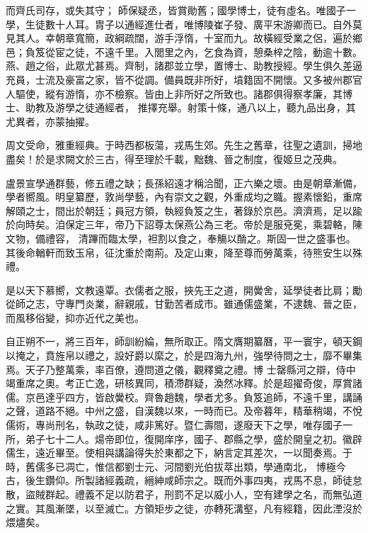 \begin{pinyinscope}
 而齊氏司存，或失其守；
 師保疑丞，皆賞勛舊；國學博士，徒有虛名。唯國子一學，生徒數十人耳。胄子以通經進仕者，唯博陵崔子發、廣平宋游卿而已。自外莫見其人。幸朝章寬簡，政綱疏闊，游手浮惰，十室而九。故橫經受業之侶，遍於鄉邑；負笈從宦之徒，不遠千里。入閭里之內，乞食為資，憩桑梓之陰，動逾十數。燕、趙之俗，此眾尤甚焉。齊制，諸郡並立學，置博士、助教授經。學生俱久差逼充員，士流及豪富之家，皆不從調。備員既非所好，墳籍固不開懷。又多被州郡官人驅使，縱有游惰，亦不檢察。皆由上非所好之所致也。諸郡俱得察孝廉，其博士、助教及游學之徒通經者，
 推擇充舉。射策十條，通八以上，聽九品出身，其尤異者，亦蒙抽擢。



 周文受命，雅重經典。于時西都板蕩，戎馬生郊。先生之舊章，往聖之遺訓，掃地盡矣！於是求闕文於三古，得至理於千載，黜魏、晉之制度，復姬旦之茂典。



 盧景宣學通群藝，修五禮之缺；長孫紹遠才稱洽聞，正六樂之壞。由是朝章漸備，學者嚮風。明皇纂歷，敦尚學藝，內有崇文之觀，外重成均之職。握素懷鉛，重席解頤之士，間出於朝廷；員冠方領，執經負笈之生，著錄於京邑。濟濟焉，足以踰於向時矣。洎保定三年，帝乃下詔尊太保燕公為三老。帝於是服兗冕，乘碧輅，陳文物，備禮容，
 清蹕而臨太學，袒割以食之，奉觴以酳之。斯固一世之盛事也。其後命輶軒而致玉帛，征沈重於南荊。及定山東，降至尊而勞萬乘，待熊安生以殊禮。



 是以天下慕嚮，文教遠覃。衣儒者之服，挾先王之道，開黌舍，延學徒者比肩；勵從師之志，守專門炎業，辭親戚，甘勤苦者成市。雖通儒盛業，不逮魏、晉之臣，而風移俗變，抑亦近代之美也。



 自正朔不一，將三百年，師訓紛綸，無所取正。隋文膺期纂曆，平一寰宇，頓天鋼以掩之，賁旌帛以禮之，設好爵以縻之，於是四海九州，強學待問之士，靡不畢集焉。天子乃整萬乘，率百僚，遵問道之儀，觀釋奠之禮。博
 士罄縣河之辯，侍中竭重席之奧。考正亡逸，研核異同，積滯群疑，渙然冰釋。於是超擢奇俊，厚賞諸儒。京邑達乎四方，皆啟黌校。齊魯趙魏，學者尤多。負笈追師，不遠千里，講誦之聲，道路不絕。中州之盛，自漢魏以來，一時而已。及帝暮年，精華稍竭，不悅儒術，專尚刑名，執政之徒，咸非篤好。暨仁壽間，遂廢天下之學，唯存國子一所，弟子七十二人。煬帝即位，復開庠序，國子、郡縣之學，盛於開皇之初。徽辟儒生，遠近畢至。使相與講論得失於東都之下，納言定其差次，一以聞奏焉。于時，舊儒多已凋亡，惟信都劉士元、河間劉光伯拔萃出類，學通南北，
 博極今古，後生鑽仰。所製諸經義疏，縉紳咸師宗之。既而外事四夷，戎馬不息，師徒怠散，盜賊群起。禮義不足以防君子，刑罰不足以威小人，空有建學之名，而無弘道之實。其風漸墜，以至滅亡。方領矩步之徒，亦轉死溝壑，凡有經籍，因此湮沒於煨燼矣。




\end{pinyinscope}

